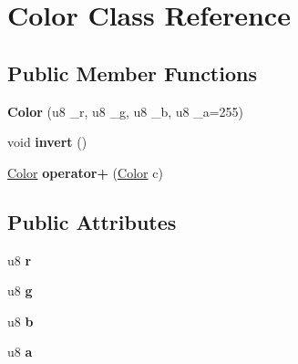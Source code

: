 \hypertarget{classColor}{\section{Color Class Reference}
\label{classColor}
}
\subsection*{Public Member Functions}
\begin{DoxyCompactItemize}
\item 
\hypertarget{classColor_ab6d156688c10e510faa604328d446d67}{{\bfseries Color} (u8 \-\_\-r, u8 \-\_\-g, u8 \-\_\-b, u8 \-\_\-a=255)}\label{classColor_ab6d156688c10e510faa604328d446d67}

\item 
\hypertarget{classColor_a1f89f11d1ed7502e40e1db6611989d2d}{void {\bfseries invert} ()}\label{classColor_a1f89f11d1ed7502e40e1db6611989d2d}

\item 
\hypertarget{classColor_adf897804ed538f1ca0c447f96418cb1c}{\hyperlink{classColor}{Color} {\bfseries operator+} (\hyperlink{classColor}{Color} c)}\label{classColor_adf897804ed538f1ca0c447f96418cb1c}

\end{DoxyCompactItemize}
\subsection*{Public Attributes}
\begin{DoxyCompactItemize}
\item 
\hypertarget{classColor_a72993753060f630faaefc6be380c8254}{u8 {\bfseries r}}\label{classColor_a72993753060f630faaefc6be380c8254}

\item 
\hypertarget{classColor_a832d316e0aacf932d9248e088138ea3b}{u8 {\bfseries g}}\label{classColor_a832d316e0aacf932d9248e088138ea3b}

\item 
\hypertarget{classColor_a51d269461e67faa12c48c3f51bae541a}{u8 {\bfseries b}}\label{classColor_a51d269461e67faa12c48c3f51bae541a}

\item 
\hypertarget{classColor_a3fd865542a4607d9c65a251d60776a89}{u8 {\bfseries a}}\label{classColor_a3fd865542a4607d9c65a251d60776a89}

\end{DoxyCompactItemize}
